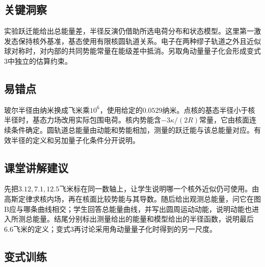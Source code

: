 \documentclass[UTF8,fontset=fandol,a4paper,11pt]{ctexart}
\begin{document}


\subsection*{关键洞察}

实验跃迁能给出总能量差，半径反演仍借助所选电荷分布和状态模型。这里第一激发态保持核外基准，基态使用有限核圆轨道关系。电子在两种缪子轨道之外且近似球对称时，对内部的共同势能常量在能级差中抵消。另取角动量量子化会形成变式3中独立的估算约束。



\subsection*{易错点}

玻尔半径由纳米换成飞米乘$10^6$，使用给定的$0.0529$纳米。点核的基态半径小于核半径时，基态力场改用实际包围电荷。核内势能含$-3\kappa/(2R)$常量，它由核面连续条件确定。圆轨道总能量由动能和势能相加，测量的跃迁能与该总能量对应。有效半径的定义和另加量子化条件分开说明。



\subsection*{课堂讲解建议}

先把$3.12,7.1,12.5$飞米标在同一数轴上，让学生说明哪一个核外近似仍可使用。由高斯定律求核内场，再在核面比较势能与其导数。随后给出观测总能量，问它在图B应与哪条曲线相交；学生回答总能量曲线，并写出圆周运动动能，说明动能也进入所测总能量。结尾分别标出测量给出的能量和模型给出的半径函数，说明最后6.6飞米的定义；变式3再讨论采用角动量量子化时得到的另一尺度。



\subsection*{变式训练}
\end{document}
